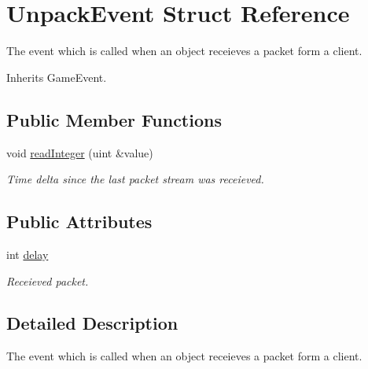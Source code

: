 \hypertarget{struct_unpack_event}{\section{Unpack\-Event Struct Reference}
\label{struct_unpack_event}
}


The event which is called when an object receieves a packet form a client.  




Inherits Game\-Event.

\subsection*{Public Member Functions}
\begin{DoxyCompactItemize}
\item 
\hypertarget{struct_unpack_event_a9659a17b416165d53534afb8f8bd8219}{void \hyperlink{struct_unpack_event_a9659a17b416165d53534afb8f8bd8219}{read\-Integer} (uint \&value)}\label{struct_unpack_event_a9659a17b416165d53534afb8f8bd8219}

\begin{DoxyCompactList}\small\item\em Time delta since the last packet stream was receieved. \end{DoxyCompactList}\end{DoxyCompactItemize}
\subsection*{Public Attributes}
\begin{DoxyCompactItemize}
\item 
\hypertarget{struct_unpack_event_a6f1be1f780ff54ec75b41451cd4d90bd}{int \hyperlink{struct_unpack_event_a6f1be1f780ff54ec75b41451cd4d90bd}{delay}}\label{struct_unpack_event_a6f1be1f780ff54ec75b41451cd4d90bd}

\begin{DoxyCompactList}\small\item\em Receieved packet. \end{DoxyCompactList}\end{DoxyCompactItemize}


\subsection{Detailed Description}
The event which is called when an object receieves a packet form a client. 

